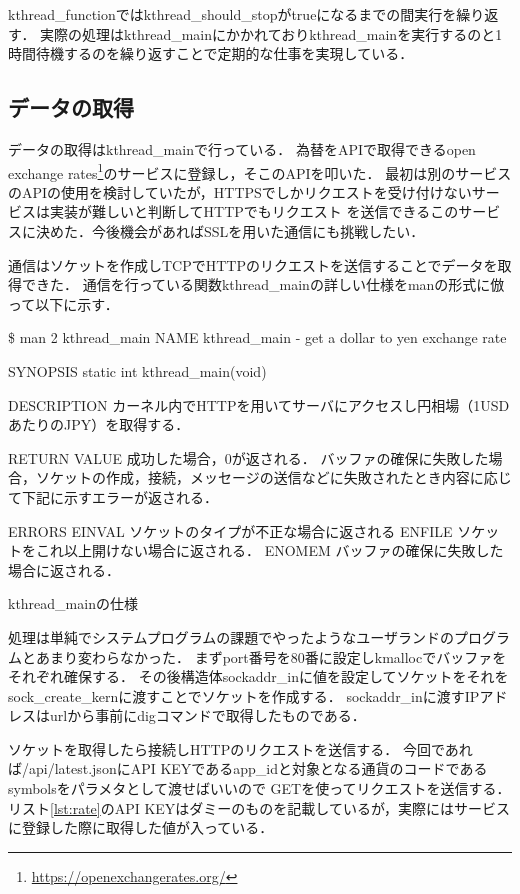kthread_functionではkthread_should_stopがtrueになるまでの間実行を繰り返す．
実際の処理はkthread_mainにかかれておりkthread_mainを実行するのと1時間待機するのを繰り返すことで定期的な仕事を実現している．

\subsection{データの取得}
データの取得はkthread_mainで行っている．
為替をAPIで取得できるopen exchange rates\footnote{\url{https://openexchangerates.org/}}のサービスに登録し，そこのAPIを叩いた．
最初は別のサービスのAPIの使用を検討していたが，HTTPSでしかリクエストを受け付けないサービスは実装が難しいと判断してHTTPでもリクエスト
を送信できるこのサービスに決めた．今後機会があればSSLを用いた通信にも挑戦したい．

通信はソケットを作成しTCPでHTTPのリクエストを送信することでデータを取得できた．
通信を行っている関数kthread_mainの詳しい仕様をmanの形式に倣って以下に示す．
\begin{longlisting}
\begin{myminted}{}{}
\$ man 2 kthread_main
NAME
       kthread_main - get a dollar to yen exchange rate

SYNOPSIS
       static int kthread_main(void)

DESCRIPTION
       カーネル内でHTTPを用いてサーバにアクセスし円相場（1USDあたりのJPY）を取得する．

RETURN VALUE
       成功した場合，0が返される．
       バッファの確保に失敗した場合，ソケットの作成，接続，メッセージの送信などに失敗されたとき内容に応じて下記に示すエラーが返される．

ERRORS
       EINVAL ソケットのタイプが不正な場合に返される
       ENFILE ソケットをこれ以上開けない場合に返される．
       ENOMEM バッファの確保に失敗した場合に返される．
\end{myminted}
\caption{kthread_mainの仕様}
\label{lst:syscallspec}
\end{longlisting}

処理は単純でシステムプログラムの課題でやったようなユーザランドのプログラムとあまり変わらなかった．
まずport番号を80番に設定しkmallocでバッファをそれぞれ確保する．
その後構造体sockaddr_inに値を設定してソケットをそれをsock_create_kernに渡すことでソケットを作成する．
sockaddr_inに渡すIPアドレスはurlから事前にdigコマンドで取得したものである．

ソケットを取得したら接続しHTTPのリクエストを送信する．
今回であれば/api/latest.jsonにAPI KEYであるapp_idと対象となる通貨のコードであるsymbolsをパラメタとして渡せばいい\cite{api}ので
GETを使ってリクエストを送信する．
リスト\ref{lst:rate}のAPI KEYはダミーのものを記載しているが，実際にはサービスに登録した際に取得した値が入っている．

